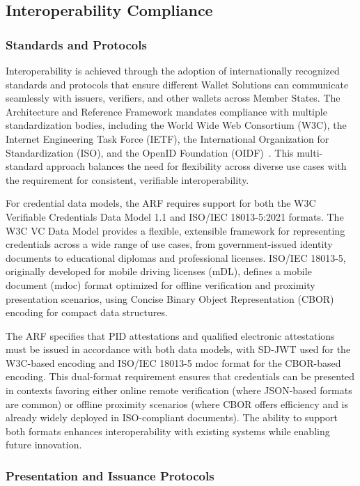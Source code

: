 \documentclass[sigconf,balance,nonacm,authordraft]{acmart}
\begin{document}
\subsection{Interoperability Compliance}

\subsubsection{Standards and Protocols}

Interoperability is achieved through the adoption of internationally recognized standards and protocols that ensure different Wallet Solutions can communicate seamlessly with issuers, verifiers, and other wallets across Member States. The Architecture and Reference Framework mandates compliance with multiple standardization bodies, including the World Wide Web Consortium (W3C), the Internet Engineering Task Force (IETF), the International Organization for Standardization (ISO), and the OpenID Foundation (OIDF)~\cite{EU_ARF2024,Finextra_SSI_Components}. This multi-standard approach balances the need for flexibility across diverse use cases with the requirement for consistent, verifiable interoperability.

For credential data models, the ARF requires support for both the W3C Verifiable Credentials Data Model 1.1 and ISO/IEC 18013-5:2021 formats. The W3C VC Data Model provides a flexible, extensible framework for representing credentials across a wide range of use cases, from government-issued identity documents to educational diplomas and professional licenses. ISO/IEC 18013-5, originally developed for mobile driving licenses (mDL), defines a mobile document (mdoc) format optimized for offline verification and proximity presentation scenarios, using Concise Binary Object Representation (CBOR) encoding for compact data structures.

The ARF specifies that PID attestations and qualified electronic attestations must be issued in accordance with both data models, with SD-JWT used for the W3C-based encoding and ISO/IEC 18013-5 mdoc format for the CBOR-based encoding. This dual-format requirement ensures that credentials can be presented in contexts favoring either online remote verification (where JSON-based formats are common) or offline proximity scenarios (where CBOR offers efficiency and is already widely deployed in ISO-compliant documents). The ability to support both formats enhances interoperability with existing systems while enabling future innovation.

\subsubsection{Presentation and Issuance Protocols}
\end{document}
